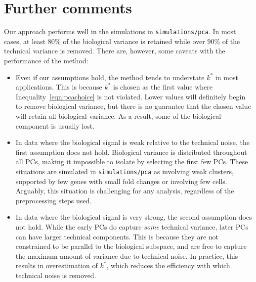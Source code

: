 \documentclass{article}
\begin{document}
\section*{Further comments}
Our approach performs well in the simulations in \texttt{simulations/pca}.
In most cases, at least 80\% of the biological variance is retained while over 90\% of the technical variance is removed.
There are, however, some caveats with the performance of the method:
\begin{itemize}
    \item Even if our assumptions hold, the method tends to understate $k^*$ in most applications.
        This is because $k^*$ is chosen as the first value where Inequality~\ref{eqn:pcachoice} is not violated.
        Lower values will definitely begin to remove biological variance, but there is no guarantee that the chosen value will retain all biological variance.
        As a result, some of the biological component is usually lost.
    \item In data where the biological signal is weak relative to the technical noise, the first assumption does not hold.
        Biological variance is distributed throughout all PCs, making it impossible to isolate by selecting the first few PCs.
        These situations are simulated in \texttt{simulations/pca} as involving weak clusters, supported by few genes with small fold changes or involving few cells.
        Arguably, this situation is challenging for any analysis, regardless of the preprocessing steps used.
    \item In data where the biological signal is very strong, the second assumption does not hold.
        While the early PCs do capture \textit{some} technical variance, later PCs can have larger technical components.
        This is because they are not constrained to be parallel to the biological subspace, and are free to capture the maximum amount of variance due to technical noise.
        In practice, this results in overestimation of $k^*$, which reduces the efficiency with which technical noise is removed.
\end{itemize}
\end{document}
